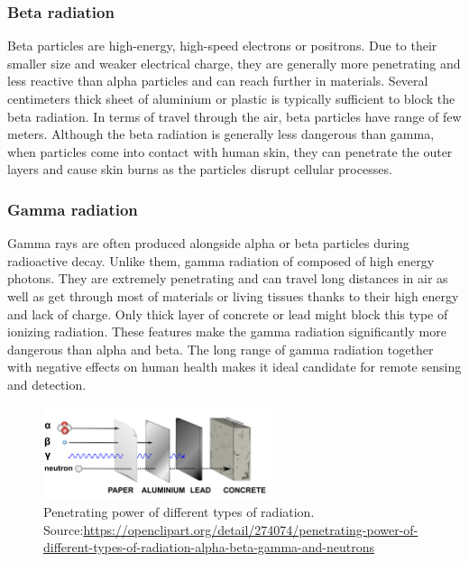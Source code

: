 \subsubsection{Beta radiation}
Beta particles are high-energy, high-speed electrons or positrons.
Due to their smaller size and weaker electrical charge, they are generally more penetrating and less reactive than alpha particles and can reach further in materials.
Several centimeters thick sheet of aluminium or plastic is typically sufficient to block the beta radiation.
In terms of travel through the air, beta particles have range of few meters.
Although the beta radiation is generally less dangerous than gamma, when particles come into contact with human skin, they can penetrate the outer layers and cause skin burns as the particles disrupt cellular processes.

\subsubsection{Gamma radiation}
Gamma rays are often produced alongside alpha or beta particles during radioactive decay. 
Unlike them, gamma radiation of composed of high energy photons. 
They are extremely penetrating and can travel long distances in air as well as get through most of materials or living tissues thanks to their high energy and lack of charge.
Only thick layer of concrete or lead might block this type of ionizing radiation.
These features make the gamma radiation significantly more dangerous than alpha and beta.
The long range of gamma radiation together with negative effects on human health makes it ideal candidate for remote sensing and detection.

  \begin{figure}[!h]
    \centering
      \includegraphics[width=0.6\textwidth]{./fig/photos/pene2.png}
    \caption{Penetrating power of different types of radiation. Source:\url{https://openclipart.org/detail/274074/penetrating-power-of-different-types-of-radiation-alpha-beta-gamma-and-neutrons}}
  \end{figure}



